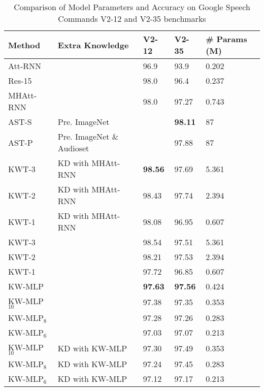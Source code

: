 \documentclass{article} \usepackage{iclr2022_conference,times}
\begin{document}
\begin{table}[ht]
	\centering
	\caption{Comparison of Model Parameters and Accuracy on Google Speech Commands V2-12 and V2-35 benchmarks \citep{warden2018speech}}
	\label{tbl:accuracy}
	\begin{tabular}	{l  l l l l }
		\hline
		Method    & Extra Knowledge & V2-12 & V2-35 & \# Params (M) \\
		\hline
		Att-RNN \quad [\citenum{de2018neural}]   & &  96.9 & 93.9  &  0.202\\
		Res-15 \quad [\citenum{vygon2021learning}]  & & 98.0 & 96.4 & 0.237\\
		MHAtt-RNN \quad [\citenum{rybakov2020streaming}]  & & 98.0 & 97.27 & 0.743\\
		\hline
		AST-S \quad [\citenum{gong2021ast}] & Pre. ImageNet  & & \textbf{98.11} & 87\\
		AST-P  \quad [\citenum{gong2021ast}] &  Pre. ImageNet  \& Audioset & & 97.88 & 87\\
		\hline
		KWT-3  \quad [\citenum{berg21_interspeech}] & KD with MHAtt-RNN & \textbf{98.56} & 97.69 & 5.361 \\
		KWT-2   \quad [\citenum{berg21_interspeech}] & KD with MHAtt-RNN & 98.43 & 97.74 & 2.394 \\
		KWT-1  \quad [\citenum{berg21_interspeech}]  & KD with MHAtt-RNN & 98.08 & 96.95 & 0.607 \\
		\hline
		KWT-3  \quad [\citenum{berg21_interspeech}] & & 98.54 & 97.51 & 5.361 \\
		KWT-2  \quad [\citenum{berg21_interspeech}]  & & 98.21 & 97.53 & 2.394 \\
		KWT-1  \quad [\citenum{berg21_interspeech}] & & 97.72 & 96.85 & 0.607 \\
		\hline
		KW-MLP  & & \textbf{97.63} & \textbf{97.56} & 0.424 \\
		KW-MLP$_{10}$   & &  97.38 & 97.35 & 0.353 \\
		KW-MLP$_{8}$   & & 97.28 & 97.26 & 0.283 \\
		KW-MLP$_{6}$   & & 97.03 & 97.07 & 0.213 \\
		\hline
		KW-MLP$_{10}$   & KD with KW-MLP & 97.30 &  97.49     & 0.353 \\
		KW-MLP$_{8}$   & KD with KW-MLP & 97.24  &  97.45     & 0.283 \\
		KW-MLP$_{6}$  & KD with KW-MLP & 97.12 & 97.17 & 0.213 \\
	\end{tabular}
\end{table}
\end{document}
